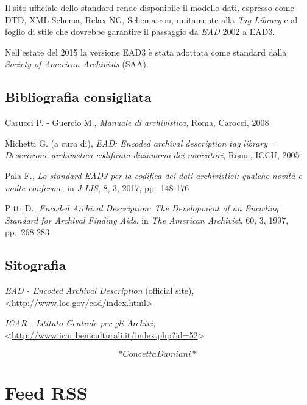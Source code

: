 \documentclass[
  b5paper,
  twoside,
  11pt,
  chapterprefix=false,
  bibliography=totocnumbered,
  listof=flat]{scrbook}
\begin{document}
Il sito ufficiale dello standard rende disponibile il modello dati,
espresso come DTD, XML Schema, Relax NG, Schematron, unitamente alla
\emph{Tag Library} e al foglio di stile che dovrebbe garantire il passaggio
da \emph{EAD} 2002 a EAD3.

Nell'estate del 2015 la versione EAD3 è stata adottata come standard
dalla \emph{Society of American Archivists} (SAA).

\hypertarget{bibliografia-consigliata-9}{%
\section*{Bibliografia consigliata}\label{bibliografia-consigliata-9}}

Carucci P. - Guercio M., \emph{Manuale di archivistica}, Roma, Carocci, 2008

Michetti G. (a cura di), \emph{EAD: Encoded archival description tag library
= Descrizione archivistica codificata dizionario dei marcatori}, Roma,
ICCU, 2005

Pala F., \emph{Lo standard EAD3 per la codifica dei dati archivistici:
qualche novità e molte conferme}, in \emph{J-LIS}, 8, 3, 2017, pp.~148-176

Pitti D., \emph{Encoded Archival Description: The Development of an Encoding
Standard for Archival Finding Aids}, in \emph{The American Archivist}, 60, 3,
1997, pp.~268-283

\hypertarget{sitografia-10}{%
\section*{Sitografia}\label{sitografia-10}}

\emph{EAD - Encoded Archival Description} (official site),
\textless{}\href{http://www.loc.gov/ead/index.html}{{http://www.loc.gov/ead/index.html}}\textgreater{}

\emph{ICAR - Istituto Centrale per gli Archivi},
\textless{}\href{http://www.icar.beniculturali.it/index.php?id=52}{{http://www.icar.beniculturali.it/index.php?id=52}}\textgreater{}

\[*Concetta Damiani*\]

\hypertarget{feed-rss}{%
\chapter{Feed RSS}\label{feed-rss}}
\end{document}
